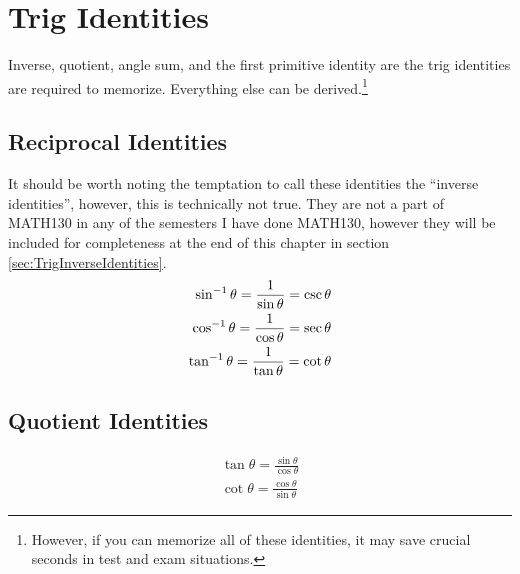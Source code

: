 \chapter{Trig Identities}
\label{chap:TrigIdentities}
Inverse, quotient, angle sum, and the first primitive identity are the trig
identities are required to memorize. Everything else can be derived.\footnote{However, if you can memorize all of these identities, it may
save crucial seconds in test and exam situations.}

\section{Reciprocal Identities}
\label{sec:TrigReciprocalIdentities}
It should be worth noting the temptation to call these identities the ``inverse
identities'', however, this is technically not true. They are not a part of
MATH130 in any of the semesters I have done MATH130, however they will be
included for completeness at the end of this chapter in section
\ref{sec:TrigInverseIdentities}.
\begin{align}
  \sin^{-1} \theta = \frac{1}{\sin \theta} = \csc \theta\\
  \cos^{-1} \theta = \frac{1}{\cos \theta} = \sec \theta\\
  \tan^{-1} \theta = \frac{1}{\tan \theta} = \cot \theta
\end{align}

\section{Quotient Identities}
\label{sec:TrigQuotientIdentities}
\begin{align}
  \tan \theta = \frac{\sin \theta}{\cos \theta} \\
  \cot \theta = \frac{\cos \theta}{\sin \theta}
\end{align}

